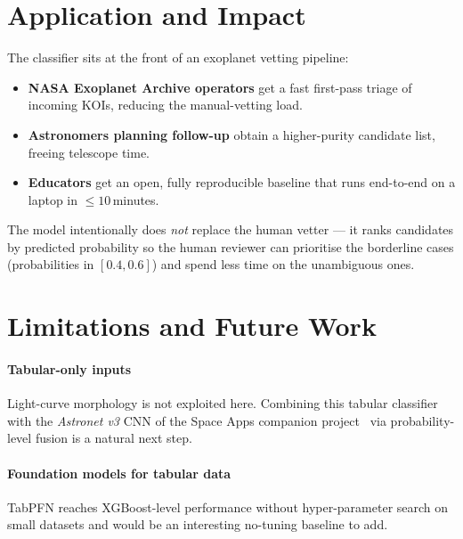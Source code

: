 \documentclass[conference]{IEEEtran}
\begin{document}
\section{Application and Impact}\label{sec:application}

The classifier sits at the front of an exoplanet vetting pipeline:

\begin{itemize}
  \item \textbf{NASA Exoplanet Archive operators} get a fast first-pass
        triage of incoming KOIs, reducing the manual-vetting load.
  \item \textbf{Astronomers planning follow-up} obtain a
        higher-purity candidate list, freeing telescope time.
  \item \textbf{Educators} get an open, fully reproducible baseline
        that runs end-to-end on a laptop in $\le 10$\,minutes.
\end{itemize}

The model intentionally does \emph{not} replace the human vetter --- it
ranks candidates by predicted probability so the human reviewer can
prioritise the borderline cases (probabilities in $[0.4, 0.6]$) and
spend less time on the unambiguous ones.

\section{Limitations and Future Work}\label{sec:future}

\paragraph*{Tabular-only inputs} Light-curve morphology is not
exploited here. Combining this tabular classifier with the
\textit{Astronet v3} CNN of the Space Apps companion
project~\cite{astronet} via probability-level fusion is a natural
next step.

\paragraph*{Foundation models for tabular data} TabPFN
\cite{hollmann2025tabpfn} reaches XGBoost-level performance without
hyper-parameter search on small datasets and would be an interesting
no-tuning baseline to add.
\end{document}

